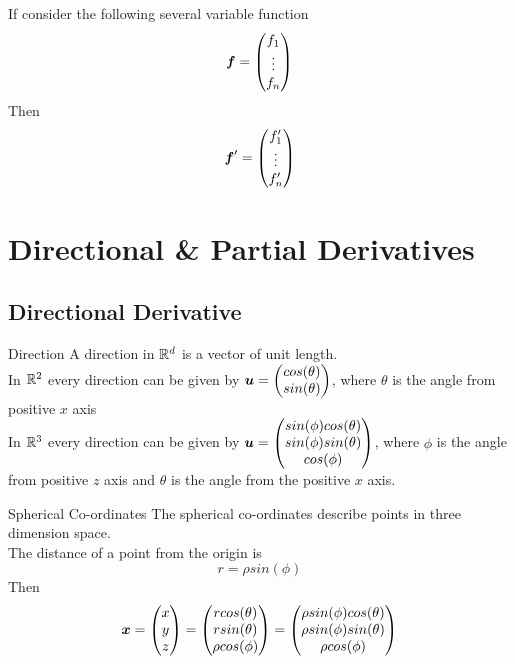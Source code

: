 \documentclass[11pt,a4paper]{article}
\begin{document}
\subtitle{Remark 9.7}{}
If consider the following several variable function
$$\boldsymbol{f} = \begin{pmatrix} f_1 \\ \vdots \\ f_n \end{pmatrix}$$
Then
$$\boldsymbol{f}' = \begin{pmatrix} f'_1 \\ \vdots \\ f'_n \end{pmatrix}$$

\section{Directional \& Partial Derivatives}
%
\subsection{Directional Derivative}

\subtitle{Definition 10.1 - }{Direction}
A direction in $\mathbb{R}^d$ is a vector of unit length. \\
In $\mathbb{R}^2$ every direction can be given by $\boldsymbol{u} = \begin{pmatrix}cos(\theta)\\ sin(\theta)\end{pmatrix}$, where $\theta$ is the angle from positive $x$ axis \\
In $\mathbb{R}^3$ every direction can be given by $\boldsymbol{u} = \begin{pmatrix}sin(\phi)cos(\theta)\\ sin(\phi)sin(\theta)\\ cos(\phi)\end{pmatrix}$, where $\phi$ is the angle from positive $z$ axis and $\theta$ is the angle from the positive $x$ axis.

\subtitle{Definition 10.2 - }{Spherical Co-ordinates}
The spherical co-ordinates describe points in three dimension space.\\
The distance of a point from the origin is $$r = \rho sin(\phi)$$
Then $$\boldsymbol{x} = \begin{pmatrix} x \\ y \\ z \end{pmatrix} = \begin{pmatrix} r cos(\theta) \\ r sin(\theta) \\ \rho cos(\phi) \end{pmatrix} = \begin{pmatrix} \rho sin(\phi)cos(\theta) \\ \rho sin(\phi)sin(\theta) \\ \rho cos(\phi) \end{pmatrix}$$
\end{document}
